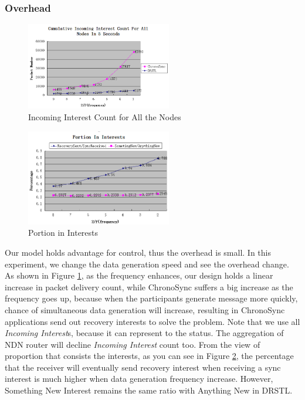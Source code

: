 \documentclass[conference]{IEEEtran}
\begin{document}
\subsubsection{Overhead}
\begin{figure}[!t]
\centering
\includegraphics[width=2.5in]{../png/all-incoming-interest.png}
\caption{Incoming Interest Count for All the Nodes}
\label{overhead}
\end{figure}
\begin{figure}[!t]
\centering
\includegraphics[width=2.5in]{../png/portion-in-interests.png}
\caption{Portion in Interests}
\label{recovery_percentage}
\end{figure}
Our model holds advantage for control, thus the overhead is small. In this experiment, we change the data generation speed and see the overhead change. As shown in Figure \ref{overhead}, as the frequency enhances, our design holds a linear increase in packet delivery count, while ChronoSync suffers a big increase as the frequency goes up, because when the participants generate message more quickly, chance of simultaneous data generation will increase, resulting in ChronoSync applications send out recovery interests to solve the problem. Note that we use all \emph{Incoming Interest}s, because it can represent to the status. The aggregation of NDN router will decline \emph{Incoming Interest} count too. From the view of proportion that consists the interests, as you can see in Figure \ref{recovery_percentage}, the percentage that the receiver will eventually send recovery interest when receiving a sync interest is much higher when data generation frequency increase. However, Something New Interest remains the same ratio with Anything New in DRSTL.
\end{document}
